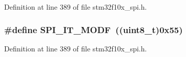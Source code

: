 Definition at line 389 of file stm32f10x\+\_\+spi.\+h.

\subsubsection[{\texorpdfstring{S\+P\+I\+\_\+\+I\+T\+\_\+\+M\+O\+DF}{SPI_IT_MODF}}]{\setlength{\rightskip}{0pt plus 5cm}\#define S\+P\+I\+\_\+\+I\+T\+\_\+\+M\+O\+DF~(({\bf uint8\+\_\+t})0x55)}\hypertarget{group___s_p_i___i2_s__interrupts__definition_ga0b9780d5f31fd80f4d0fa7d6860041e9}{}\label{group___s_p_i___i2_s__interrupts__definition_ga0b9780d5f31fd80f4d0fa7d6860041e9}


Definition at line 389 of file stm32f10x\+\_\+spi.\+h.

